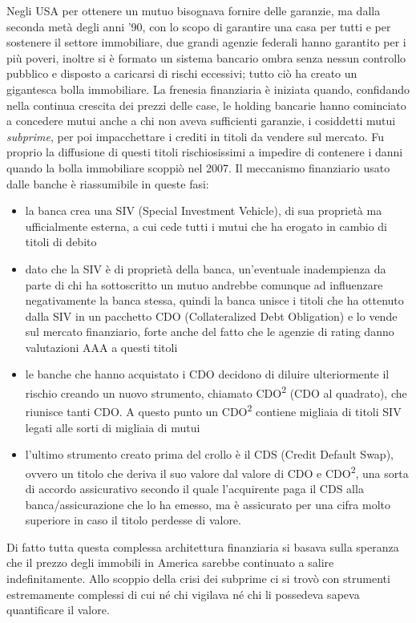 \documentclass[11pt]{article}
\begin{document}
Negli USA per ottenere un mutuo bisognava fornire delle garanzie, ma dalla
seconda met\`a degli anni '90, con lo scopo di garantire una casa per tutti e
per sostenere il settore immobiliare, due grandi agenzie federali hanno garantito per
i pi\`u poveri, inoltre si \`e formato un sistema bancario ombra senza nessun
controllo pubblico e disposto a caricarsi di rischi eccessivi; tutto ci\`o ha creato un gigantesca bolla immobiliare.
La frenesia finanziaria \`e iniziata quando, confidando
nella continua crescita dei prezzi delle case, le holding bancarie
hanno cominciato a concedere mutui anche a chi non aveva sufficienti garanzie, i cosiddetti mutui
\emph{subprime}, per poi impacchettare i crediti in titoli da vendere sul mercato.
Fu proprio la diffusione di questi titoli rischiosissimi a impedire di contenere i danni
quando la bolla immobiliare scoppi\`o nel 2007.
Il meccanismo finanziario usato dalle banche \`e riassumibile in queste fasi:
\begin{itemize}
\item la banca crea una SIV (Special Investment Vehicle), di sua propriet\`a ma
ufficialmente esterna, a cui cede tutti i mutui che ha erogato in cambio di titoli di debito
\item dato che la SIV \`e di propriet\`a della banca, un'eventuale inadempienza da parte di chi ha sottoscritto un
mutuo andrebbe comunque ad influenzare negativamente la banca stessa, quindi la banca unisce i titoli che ha ottenuto dalla SIV
in un pacchetto CDO (Collateralized Debt Obligation) e lo vende sul mercato finanziario, forte anche del fatto che le agenzie di rating 
danno valutazioni AAA a questi titoli
\item le banche che hanno acquistato i CDO decidono di diluire ulteriormente il rischio creando un nuovo strumento, chiamato
CDO\textsuperscript{2}  (CDO al quadrato), che riunisce tanti CDO. A questo punto un CDO\textsuperscript{2} contiene
migliaia di titoli SIV legati alle sorti di migliaia di mutui
\item l'ultimo strumento creato prima del crollo \`e il CDS (Credit Default Swap), ovvero un titolo che deriva il suo valore
dal valore di CDO e CDO\textsuperscript{2}, una sorta di accordo assicurativo secondo il quale l'acquirente
paga il CDS alla banca/assicurazione che lo ha emesso, ma \`e assicurato per una cifra molto superiore
in caso il titolo perdesse di valore.
\end{itemize}
Di fatto tutta questa complessa architettura finanziaria si basava sulla
speranza che il prezzo degli immobili in America sarebbe continuato a salire
indefinitamente. 
Allo scoppio della crisi dei subprime ci si trov\`o
con strumenti estremamente complessi di cui n\'e chi vigilava n\'e chi li
possedeva sapeva quantificare il valore.
\end{document}
